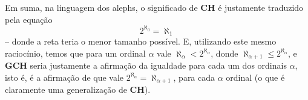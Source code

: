\documentclass{hipatia}
\newcommand{\ch}{\mathbf{CH}}
\newcommand{\gch}{\mathbf{GCH}}
\begin{document}
Em suma, na linguagem dos alephs, o significado de $\ch$ é
justamente traduzido pela equação $$2^{\aleph_0}=\aleph_1$$
-- donde a reta teria o menor tamanho possível. E,
utilizando este mesmo raciocínio, temos que para um ordinal
$\alpha$ vale $\aleph_\alpha<2^{\aleph_\alpha}$, donde
$\aleph_{\alpha+1}\leq2^{\aleph_\alpha}$, e $\gch$ seria
justamente a afirmação da igualdade para cada um dos
ordinais $\alpha$, isto é, é a afirmação de que vale
$2^{\aleph_\alpha}=\aleph_{\alpha+1}$, para cada $\alpha$
ordinal (o que é claramente uma generalização de $\ch$).

\begin{figure}[htb!]
\begin{center}
\end{center}
\end{figure}
\end{document}
